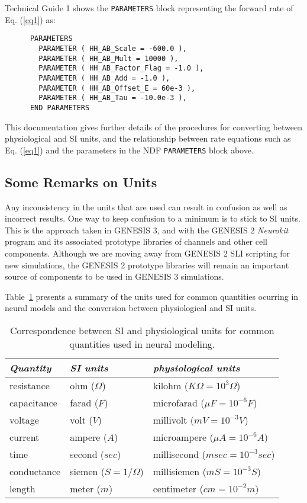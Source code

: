 \documentclass[12pt]{article}
\begin{document}
Technical Guide 1 shows the {\tt PARAMETERS} block representing the forward
rate of Eq. (\ref{eq1}) as:

\begin{verbatim}
      PARAMETERS
        PARAMETER ( HH_AB_Scale = -600.0 ),
        PARAMETER ( HH_AB_Mult = 10000 ),
        PARAMETER ( HH_AB_Factor_Flag = -1.0 ),
        PARAMETER ( HH_AB_Add = -1.0 ),
        PARAMETER ( HH_AB_Offset_E = 60e-3 ),
        PARAMETER ( HH_AB_Tau = -10.0e-3 ),
      END PARAMETERS
\end{verbatim}

This documentation gives further details of the procedures for converting
between physiological and SI units, and the relationship between rate equations
such as Eq. (\ref{eq1}) and the parameters in the NDF {\tt PARAMETERS}
block above.

\subsection{Some Remarks on Units}

Any inconsistency in the units that are used can result in confusion as
well as incorrect results.  One way to keep confusion to a minimum is to
stick to SI units.  This is the approach taken in GENESIS 3, and with the GENESIS 2
{\em Neurokit\/} program and its associated prototype libraries of channels
and other cell components.  Although we are moving away from GENESIS 2
SLI scripting for new simulations, the GENESIS 2 prototype libraries will
remain an important source of components to be used in GENESIS 3
simulations.

Table~\ref{tab1} presents a summary of
the units used for common quantities ocurring in neural models and
the conversion between physiological and SI units.

\begin{table}[thb]
\label{tab1}
\centering
\begin{tabular}{lll} \hline
{\em Quantity}   & {\em SI units}       & {\em physiological units} \\
\hline
  resistance   & ohm ($\Omega$)  & kilohm ($K\Omega = 10^3 \Omega$) \\
  capacitance  & farad ($F$)     & microfarad ($\mu F = 10^{-6} F$) \\
  voltage      & volt ($V$)      & millivolt ($mV = 10^{-3} V$) \\
  current      & ampere ($A$)    & microampere ($\mu A = 10^{-6} A$) \\
  time         & second ($sec$)  & millisecond ($msec = 10^{-3} sec$) \\
  conductance & siemen ($S = 1/\Omega$) & millisiemen ($mS = 10^{-3} S$) \\
  length       & meter ($m$)     & centimeter ($cm = 10^{-2} m$) \\
\hline
\end{tabular}
\caption{Correspondence between SI and physiological units for common
quantities used in neural modeling.}
\end{table}
\end{document}
